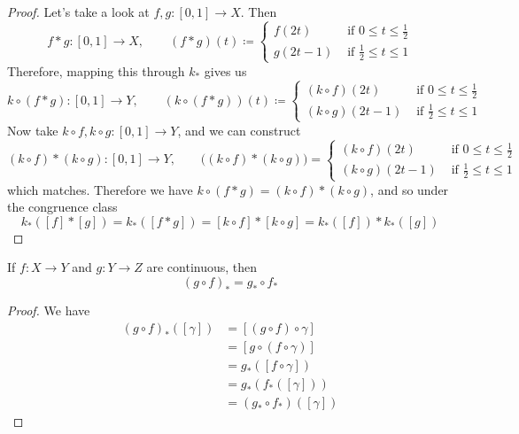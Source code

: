   \begin{proof}
    Let's take a look at $f, g: [0, 1] \to X$. Then 
    \begin{equation}
      f \ast g : [0, 1] \to X, \qquad (f \ast g)(t) \coloneqq 
      \begin{cases} 
        f(2t)  & \text{ if } 0 \leq t \leq \frac{1}{2} \\ 
        g(2t - 1) & \text{ if } \frac{1}{2} \leq t \leq 1
      \end{cases}
    \end{equation}
    Therefore, mapping this through $k_\ast$ gives us 
    \begin{equation}
      k \circ (f \ast g) : [0, 1] \to Y, \qquad (k \circ (f \ast g)) (t) \coloneqq
      \begin{cases} 
        (k \circ f)(2t)  & \text{ if } 0 \leq t \leq \frac{1}{2} \\ 
        (k \circ g)(2t - 1) & \text{ if } \frac{1}{2} \leq t \leq 1
      \end{cases}
    \end{equation}
    Now take $k \circ f, k \circ g: [0, 1] \to Y$, and we can construct 
    \begin{equation}
      (k \circ f) \ast (k \circ g) : [0, 1] \to Y, \qquad \big( (k \circ f) \ast (k \circ g) \big) = \begin{cases} 
        (k \circ f) (2t) & \text{ if } 0 \leq t \leq \frac{1}{2} \\ 
        (k \circ g) (2t - 1) & \text{ if } \frac{1}{2} \leq t \leq 1
      \end{cases}
    \end{equation}
    which matches. Therefore we have $k \circ (f \ast g) = (k \circ f) \ast (k \circ g)$, and so under the congruence class 
    \begin{equation}
      k_\ast ([f] \ast [g]) = k_\ast([f \ast g]) = [k \circ f] \ast [k \circ g] = k_\ast ([f]) \ast k_\ast ([g]) 
    \end{equation}
  \end{proof}

	\begin{lemma}
	  \label{thm:composition-of-induced-group-homomorphisms}
		If $f: X \to Y$ and $g: Y \to Z$ are continuous, then
		\begin{equation}
			(g \circ f)_\ast = g_\ast \circ f_\ast
		\end{equation}
	\end{lemma}
	\begin{proof}
		We have
		\begin{align}
			(g \circ f)_\ast ([\gamma]) & = [(g \circ f) \circ \gamma] \\
																 & = [g \circ (f \circ \gamma)] \\
																 & = g_\ast ([f \circ \gamma]) \\
																 & = g_\ast (f_\ast ([\gamma])) \\
																 & = (g_\ast \circ f_\ast) ([\gamma])
		\end{align}
	\end{proof}

